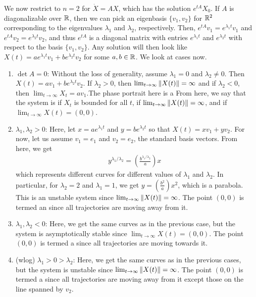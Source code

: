 We now restrict to $n = 2$ for $\dot{X} = AX$, which has the solution $e^{tA}X_{0}$. If $A$ is diagonalizable over $\mathbb{R}$, then we can pick an eigenbasis $\{v_{1},v_{2}\}$ for $\mathbb{R}^{2}$ corresponding to the eigenvalues $\lambda_{1}$ and $\lambda_{2}$, respectively. Then, $e^{tA} v_{1} = e^{\lambda_{1} t} v_{1}$ and $e^{tA} v_{2} = e^{\lambda_{2} t} v_{2}$, and thus $e^{tA}$ is a diagonal matrix with entries $e^{\lambda_{1} t}$ and $e^{\lambda_{2} t}$ with respect to the basis $\{v_{1},v_{2}\}$. Any solution will then look like $X(t) = a e^{\lambda_{1} t} v_{1} + b e^{\lambda_{2} t} v_{2}$ for some $a,b \in \mathbb{R}$. We look at cases now.

\begin{enumerate}
    \item $\det A = 0$: Without the loss of generality, assume $\lambda_{1} = 0$ and $\lambda_{2} \neq 0$. Then $X(t) = av_{1} + be^{\lambda_{2} t} v_{2}$. If $\lambda_{2} > 0$, then $\lim_{t \to \infty} \left\lVert X(t)\right\rVert = \infty$ and if $\lambda_{2} < 0$, then $\lim_{t \to \infty} X_{t} = av_{1}$.The phase portrait here is a  From here, we say that the system is  if $X_{t}$ is bounded for all $t$,  if $\lim_{t \to \infty} \left\lVert X(t)\right\rVert = \infty$, and  if $\lim_{t \to \infty} X(t) = (0,0)$.
    
    \item $\lambda_{1}, \lambda_{2} > 0$: Here, let $x = ae^{\lambda_{1} t}$ and $y = be^{\lambda_{2} t}$ so that $X(t) = xv_{1} + yv_{2}$. For now, let us assume $v_{1} = e_{1}$ and $v_{2} = e_{2}$, the standard basis vectors. From here, we get
    \begin{align}
        y^{\lambda_{1}/\lambda_{2}} = \left( \frac{b^{\lambda_{1}/\lambda_{2}}}{a} \right)x
    \end{align}
    which represents different curves for different values of $\lambda_{1}$ and $\lambda_{2}$. In particular, for $\lambda_{2} = 2$ and $\lambda_{1} = 1$, we get $y = \left( \frac{b^{2}}{a} \right) x^{2}$, which is a parabola. This is an unstable system since $\lim_{t \to \infty} \left\lVert X(t)\right\rVert = \infty$. The point $(0,0)$ is termed an  since all trajectories are moving away from it.

    \item $\lambda_{1},\lambda_{2} < 0$: Here, we get the same curves as in the previous case, but the system is asymptotically stable since $\lim_{t \to \infty} X(t) = (0,0)$. The point $(0,0)$ is termed a  since all trajectories are moving towards it.
    
    \item (wlog) $\lambda_{1} > 0 > \lambda_{2}$: Here, we get the same curves as in the previous cases, but the system is unstable since $\lim_{t \to \infty} \left\lVert X(t)\right\rVert = \infty$. The point $(0,0)$ is termed a  since all trajectories are moving away from it except those on the line spanned by $v_{2}$.
\end{enumerate}

